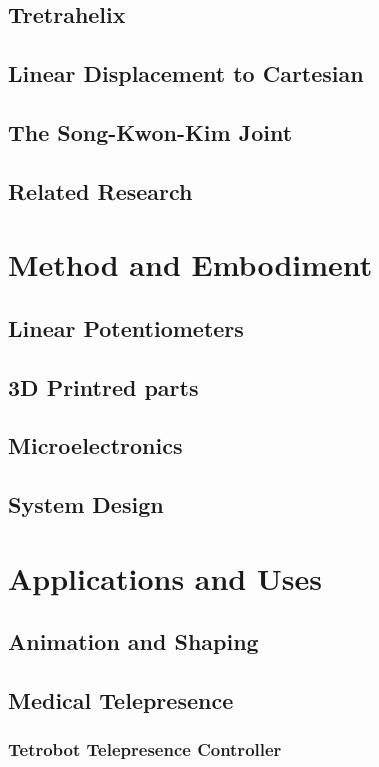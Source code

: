 \documentclass[11pt]{article}
\begin{document}
\subsection{Tretrahelix}
\subsection{Linear Displacement to Cartesian}
\subsection{The Song-Kwon-Kim Joint}
\subsection{Related Research}

\section{Method and Embodiment}
\subsection{Linear Potentiometers}
\subsection{3D Printred parts}
\subsection{Microelectronics}
\subsection{System Design}

\section{Applications and Uses}
\subsection{Animation and Shaping}
\subsection{Medical Telepresence}
\subsubsection{Tetrobot Telepresence Controller }
\end{document}
